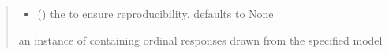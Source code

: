 \documentclass[letterpaper,10pt,english]{sphinxmanual}
\begin{document}
\begin{fulllineitems}
\begin{quote}
\begin{description}
\begin{itemize}
\item {} 
\sphinxAtStartPar
{} (\sphinxstyleliteralemphasis{\sphinxupquote{, }}) \textendash{} the  to ensure reproducibility, defaults to None

\end{itemize}

\sphinxAtStartPar
an instance of  containing ordinal responses drawn from the specified model

\end{description}\end{quote}

\end{fulllineitems}

\end{document}
